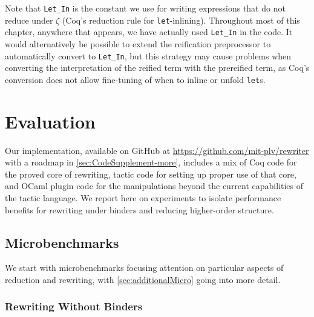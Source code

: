 Note that \texttt{Let_In} is the constant we use for writing  expressions that do not reduce under $\zeta$ (Coq's reduction rule for \texttt{let}-inlining).
Throughout most of this chapter, anywhere that  appears, we have actually used \texttt{Let_In} in the code.
It would alternatively be possible to extend the reification preprocessor to automatically convert  to \texttt{Let_In}, but this strategy may cause problems when converting the interpretation of the reified term with the prereified term, as Coq's conversion does not allow fine-tuning of when to inline or unfold \texttt{let}s.

\section{Evaluation}\label{sec:evaluation}

Our implementation, available on GitHub at \url{https://github.com/mit-plv/rewriter} with a roadmap in \autoref{sec:CodeSupplement-more}, includes a mix of Coq code for the proved core of rewriting, tactic code for setting up proper use of that core, and OCaml plugin code for the manipulations beyond the current capabilities of the tactic language.
We report here on experiments to isolate performance benefits for rewriting under binders and reducing higher-order structure.

\subsection{Microbenchmarks}\label{sec:micro}

\def\NoBindersSubfloatNval{3}%
\def\NoBindersSubfloatXRow{\thisrowno{0}*(2^(\nval+1)-1)}%

We start with microbenchmarks focusing attention on particular aspects of reduction and rewriting, with \autoref{sec:additionalMicro} going into more detail.

\bgroup
{}
\subsubsection{Rewriting Without Binders}\label{sec:micro:Plus0Tree}

